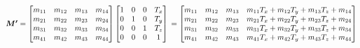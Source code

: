 \documentclass[12pt]{article}
\begin{document}
$
\boldsymbol{M'}=
\begin{bmatrix} 
m_{11} & m_{12} & m_{13} & m_{14} \\ 
m_{21} & m_{22} & m_{23} & m_{24} \\ 
m_{31} & m_{32} & m_{33} & m_{34} \\ 
m_{41} & m_{42} & m_{43} & m_{44} \\ 
\end{bmatrix}
\begin{bmatrix} 
1 & 0 & 0 & T_x \\ 
0 & 1 & 0 & T_y \\ 
0 & 0 & 1 & T_z \\ 
0 & 0 & 0 & 1 \\ 
\end{bmatrix} \\
\\
=
\begin{bmatrix} 
m_{11} & m_{12} & m_{13} & m_{11}T_x + m_{12}T_y + m_{13}T_z + m_{14} \\ 
m_{21} & m_{22} & m_{23} & m_{21}T_x + m_{22}T_y + m_{23}T_z + m_{24} \\ 
m_{31} & m_{32} & m_{33} & m_{31}T_x + m_{32}T_y + m_{33}T_z + m_{34} \\ 
m_{41} & m_{42} & m_{43} & m_{41}T_x + m_{42}T_y + m_{43}T_z + m_{44} \\ 
\end{bmatrix}
$
\end{document}
